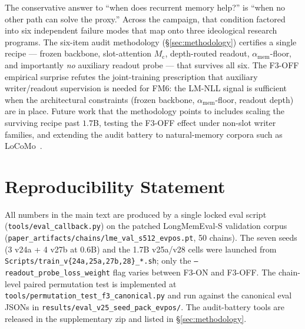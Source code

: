 \documentclass{article}
\newcommand{\Mc}{M_{\mathrm{c}}}
\newcommand{\amem}{\alpha_{\mathrm{mem}}}
\begin{document}
The conservative answer to ``when does recurrent memory help?'' is
``when no other path can solve the proxy.''  Across the campaign,
that condition factored into six independent failure modes that map
onto three ideological research programs.  The six-item audit
methodology (\S\ref{sec:methodology}) certifies a single recipe ---
frozen backbone, slot-attention $\Mc$, depth-routed readout,
$\amem$-floor, and importantly \emph{no} auxiliary readout probe ---
that survives all six.  The F3-OFF empirical surprise refutes the
joint-training prescription that auxiliary writer/readout
supervision is needed for FM6: the LM-NLL signal is sufficient when
the architectural constraints (frozen backbone, $\amem$-floor,
readout depth) are in place.  Future work that the methodology
points to includes scaling the surviving recipe past $1.7$B,
testing the F3-OFF effect under non-slot writer families, and
extending the audit battery to natural-memory corpora such as
LoCoMo~\cite{locomo2024}.

\section*{Reproducibility Statement}

All numbers in the main text are produced by a single locked eval
script (\texttt{tools/eval\_callback.py}) on the patched
LongMemEval-S validation corpus
(\texttt{paper\_artifacts/chains/lme\_val\_s512\_evpos.pt},
50 chains).  The seven seeds (3 v24a + 4 v27b at 0.6B) and the
1.7B v25a/v28 cells were launched from
\texttt{Scripts/train\_v\{24a,25a,27b,28\}\_*.sh}; only the
\texttt{--readout\_probe\_loss\_weight} flag varies between F3-ON and
F3-OFF.  The chain-level paired permutation test is implemented at
\texttt{tools/permutation\_test\_f3\_canonical.py} and run against
the canonical eval JSONs in
\texttt{results/eval\_v25\_seed\_pack\_evpos/}.  The audit-battery
tools are released in the supplementary zip and listed in
\S\ref{sec:methodology}.
\end{document}

